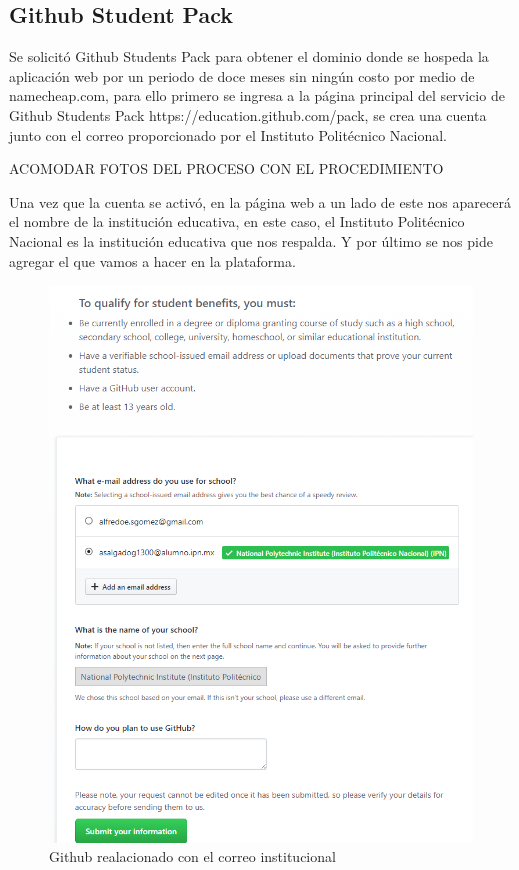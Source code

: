 \documentclass[12pt, a4paper, titlepage]{report}
\begin{document}
		\subsection{Github Student Pack}
		Se solicitó Github Students Pack para obtener el dominio donde se hospeda la aplicación web por un periodo de doce meses sin ningún costo por medio de namecheap.com, para ello primero se ingresa a la página principal del servicio de {Github Students Pack} {https://education.github.com/pack}, se crea una cuenta junto con el correo proporcionado por el Instituto Politécnico Nacional.\par
		\par ACOMODAR FOTOS DEL PROCESO CON EL PROCEDIMIENTO \par Una vez que la cuenta se activó, en la página web a un lado de este nos aparecerá el nombre de la institución educativa, en este caso, el Instituto Politécnico Nacional es la institución educativa que nos respalda. Y por último se nos pide agregar el que vamos a hacer en la plataforma.\par
		\begin{figure}[H]
			\includegraphics[width=12cm]{./imagenes/MarcoTeorico/GitHub/GitS1.png}
			\centering 
			\caption{Github realacionado con el correo institucional}
		\end{figure}
\end{document}
